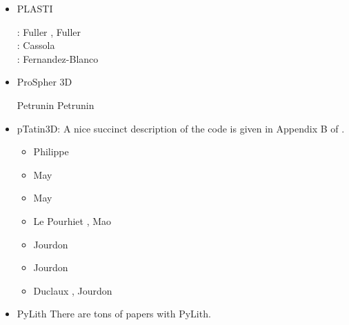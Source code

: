 \begin{itemize}
\item PLASTI

\begin{scriptsize}
\twothousandsix: Fuller \etal \cite{fuwb06}, Fuller \etal \cite{fuwf06}\\
\twothousandthirteen: Cassola \cite{cass13}\\
\twothousandtwenty: Fernandez-Blanco \cite{femb20}
\end{scriptsize}

\item ProSpher 3D

Petrunin \etal \cite{pekr13} 
Petrunin \etal \cite{peke20}


\item pTatin3D: A nice succinct description of the code is given in Appendix B of \cite{lemh17}. 

\begin{scriptsize}
\begin{itemize}
\item[\twothousandthirteen] Philippe \cite{phil13}
\item[\twothousandfourteen] May \etal \cite{mabl14}
\item[\twothousandfifteen] May \etal \cite{mabl15}
\item[\twothousandseventeen] Le Pourhiet \etal \cite{lemh17}, Mao \etal \cite{magm17}
\item[\twothousandeighteen] Jourdon \etal \cite{jolp18}
\item[\twothousandnineteen] Jourdon \etal \cite{jolm19}
\item[\twothousandtwenty] Duclaux \etal \cite{duhm20}, Jourdon \etal \cite{jolm20}
\end{itemize}
\end{scriptsize}

\item PyLith 
There are tons of papers with PyLith. 


\end{itemize}
